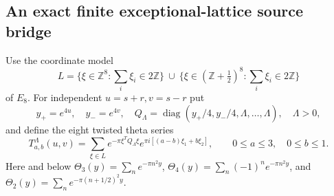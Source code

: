 \documentclass[11pt]{article}
\numberwithin{equation}{section}
\theoremstyle{definition}
\theoremstyle{remark}
\begin{document}
\subsection{An exact finite exceptional-lattice source bridge}
\label{sf:e8-bridge}

Use the coordinate model
\[
 L=\{\xi\in\mathbb Z^8:\textstyle\sum_i\xi_i\in2\mathbb Z\}
 \ \cup\
 \{\xi\in(\mathbb Z+\tfrac12)^8:
                       \textstyle\sum_i\xi_i\in2\mathbb Z\}
\]
of \(E_8\).  For independent \(u=s+r,v=s-r\) put
\[
 y_+=e^{4u},\quad y_-=e^{4v},\quad
 Q_\Lambda=\operatorname{diag}(y_+/4,y_-/4,\Lambda,\ldots,\Lambda),
 \quad \Lambda>0,
\]
and define the eight twisted theta series
\[
 T_{a,b}^{\Lambda}(u,v)=
 \sum_{\xi\in L}e^{-\pi\xi^TQ_\Lambda\xi}
             e^{\pi i[(a-b)\xi_1+b\xi_2]},
 \qquad 0\le a\le3,\quad 0\le b\le1.
\]
Here and below
\(\Theta_3(y)=\sum_ne^{-\pi n^2y}\),
\(\Theta_4(y)=\sum_n(-1)^ne^{-\pi n^2y}\), and
\(\Theta_2(y)=\sum_ne^{-\pi(n+1/2)^2y}\).
\end{document}
